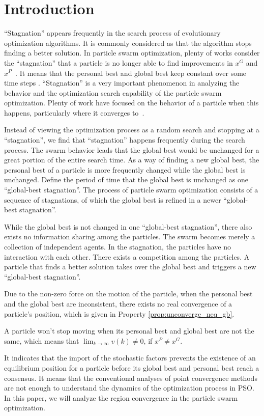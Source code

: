 \section{Introduction}
\label{sec:introduction}

``Stagnation'' appears frequently in the search process of evolutionary optimization algorithms. 
It is commonly considered as that the algorithm stops finding a better solution.
In particle swarm optimization,
plenty of works consider the ``stagnation'' that a particle is no longer able to find improvements in $ x^{G} $ and $ x^{P} $~\cite{Clerc06stagnationanalysis}.
It means that the personal best and global best keep constant over some time steps \cite{4223160}.
``Stagnation'' is a very important phenomenon in analyzing the behavior and the optimization search capability of the particle swarm optimization.
Plenty of work have focused on the behavior of a particle when this happens, particularly where it converges to~\cite{Schmitt:2013:PSO:2463372.2463563}\cite{Poli:2008:DSS:1384929.1384944}.

Instead of viewing the optimization process as a random search and stopping at a ``stagnation'', we find that ``stagnation'' happens frequently during the search process.
The swarm behavior leads that the global best would be unchanged for a great portion of the entire search time.
As a way of finding a new global best, the personal best of a particle is more frequently changed while the global best is unchanged. 
Define the period of time that the global best is unchanged as one ``global-best stagnation''.
The process of particle swarm optimization consists of a sequence of stagnations, of which the global best is refined in a newer ``global-best stagnation''.

While the global best is not changed in one ``global-best stagnation'', there also exists no information sharing among the particles.
The swarm becomes merely a collection of independent agents.
In the stagnation, the particles have no interaction with each other.
There exists a competition among the particles.
A particle that finds a better solution takes over the global best and triggers a new ``global-best stagnation''.

Due to the non-zero force on the motion of the particle, when the personal best and the global best are inconsistent, there exists no real convergence of a particle's position, which is given in Property \ref{prop:unconverge_neq_gb}.
\begin{myprop}
\label{prop:unconverge_neq_gb}
A particle won't stop moving when its personal best and global best are not the same, 
which means that 
$ \lim_{k \rightarrow \infty} v(k) \neq 0 $, if $ x^{P} \neq x^{G} $.
\end{myprop}
It indicates that the import of the stochastic factors prevents the existence of an equilibrium position for a particle before its global best and personal best reach a consensus.
It means that the conventional analyses of point convergence methods are not enough to understand the dynamics of the optimization process in PSO.
In this paper, we will analyze the region convergence in the particle swarm optimization.